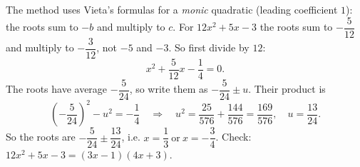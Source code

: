 The method uses Vieta's formulas for a \emph{monic} quadratic (leading coefficient $1$): the roots sum to $-b$ and multiply to $c$. For $12x^2+5x-3$ the roots sum to $-\dfrac{5}{12}$ and multiply to $-\dfrac{3}{12}$, not $-5$ and $-3$. So first divide by $12$:
\[
x^2+\dfrac{5}{12}x-\dfrac{1}{4}=0 .
\]
The roots have average $-\dfrac{5}{24}$, so write them as $-\dfrac{5}{24}\pm u$. Their product is
\[
\left(-\dfrac{5}{24}\right)^2-u^2=-\dfrac{1}{4}\quad\Longrightarrow\quad u^2=\dfrac{25}{576}+\dfrac{144}{576}=\dfrac{169}{576},\quad u=\dfrac{13}{24}.
\]
So the roots are $-\dfrac{5}{24}\pm\dfrac{13}{24}$, i.e. $\boxed{x=\dfrac{1}{3}\ \text{or}\ x=-\dfrac{3}{4}}$. Check: $12x^2+5x-3=(3x-1)(4x+3)$.
